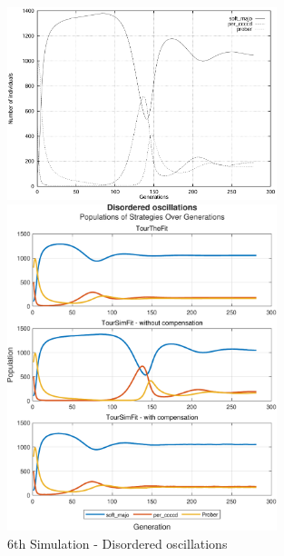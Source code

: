 \documentclass[12pt]{article}
\begin{document}
	\begin{figure}[h]
	    \centering
		\includegraphics[width=0.7\textwidth]{RefPaperFigures/fig6.jpeg}\par\vspace{0.5em}
	    \includegraphics[width=0.7\textwidth]{Disordered oscillations.pdf}
	    \caption{6th Simulation - Disordered oscillations}
	    \label{fig:Disordered oscillations}
	\end{figure}
\end{document}
